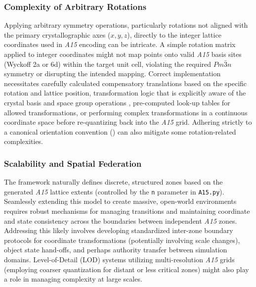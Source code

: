 \documentclass[10pt]{article}
\def\AAAB{\textit{A15}}
\begin{document}
\subsubsection{Complexity of Arbitrary Rotations}\label{subsubsec-limits-symmetry}
Applying arbitrary symmetry operations, particularly rotations not aligned with the primary crystallographic axes ($x,y,z$), directly to the integer lattice coordinates used in \AAAB{} encoding can be intricate. A simple rotation matrix applied to integer coordinates might not map points onto valid \AAAB{} basis sites (Wyckoff 2a or 6d) within the target unit cell, violating the required $Pm\bar{3}n$ symmetry or disrupting the intended mapping. Correct implementation necessitates carefully calculated compensatory translations based on the specific rotation and lattice position, transformation logic that is explicitly aware of the crystal basis and space group operations \cite{ITCVolumeA2016}, pre-computed look-up tables for allowed transformations, or performing complex transformations in a continuous coordinate space before re-quantizing back into the \AAAB{} grid. Adhering strictly to a canonical orientation convention () can also mitigate some rotation-related complexities.

\subsubsection{Scalability and Spatial Federation}\label{subsubsec-limits-federation}
The framework naturally defines discrete, structured zones based on the generated \AAAB{} lattice extents (controlled by the \texttt{n} parameter in \texttt{A15.py}). Seamlessly extending this model to create massive, open-world environments requires robust mechanisms for managing transitions and maintaining coordinate and state consistency across the boundaries between independent \AAAB{} zones. Addressing this likely involves developing standardized inter-zone boundary protocols for coordinate transformations (potentially involving scale changes), object state hand-offs, and perhaps authority transfer between simulation domains. Level-of-Detail (LOD) systems \cite{Luebke2002} utilizing multi-resolution \AAAB{} grids (employing coarser quantization for distant or less critical zones) might also play a role in managing complexity at large scales.
\end{document}
